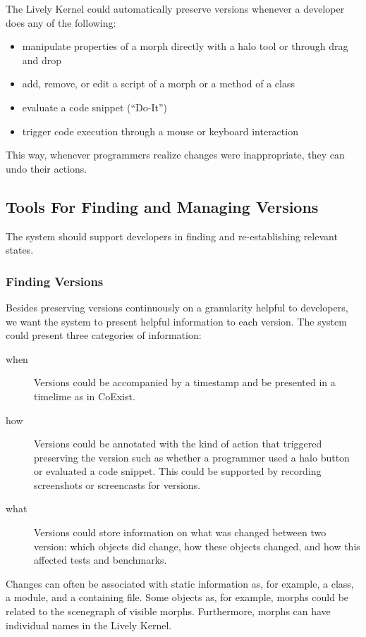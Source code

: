 The Lively Kernel could automatically preserve versions whenever a developer does any of the following:
\begin{itemize}
    \item manipulate properties of a morph directly with a halo tool or through drag and drop
    \item add, remove, or edit a script of a morph or a method of a class
    \item evaluate a code snippet (``Do-It'')
    \item trigger code execution through a mouse or keyboard interaction
\end{itemize}

This way, whenever programmers realize changes were inappropriate, they can undo their actions.


\subsection{Tools For Finding and Managing Versions}

The system should support developers in finding and re-establishing relevant states.

\subsubsection{Finding Versions}

Besides preserving versions continuously on a granularity helpful to developers, we want the system to present helpful information to each version.
The system could present three categories of information:

\begin{description}
    \item[when] Versions could be accompanied by a timestamp and be presented in a timelime as in CoExist.
    \item[how] Versions could be annotated with the kind of action that triggered preserving the version such as whether a programmer used a halo button or evaluated a code snippet. This could be supported by recording screenshots or screencasts for versions.
    \item[what] Versions could store information on what was changed between two version: which objects did change, how these objects changed, and how this affected tests and benchmarks.
\end{description}

Changes can often be associated with static information as, for example, a class, a module, and a containing file.
Some objects as, for example, morphs could be related to the scenegraph of visible morphs.
Furthermore, morphs can have individual names in the Lively Kernel.

